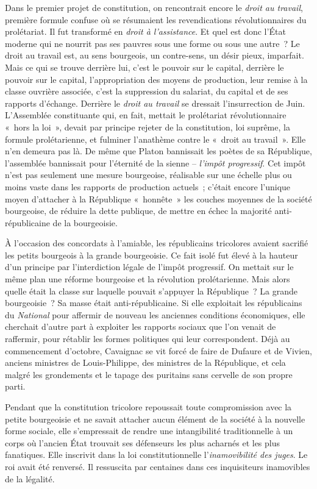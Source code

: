 \documentclass[twoside]{book} %
\begin{document}
Dans le premier projet de constitution, on rencontrait encore le \emph{droit au travail}, première formule confuse où se résumaient les revendications révolutionnaires du prolétariat. Il fut transformé en \emph{droit à l’assistance}. Et quel est donc l’État moderne qui ne nourrit pas ses pauvres sous une forme ou sous une autre ? Le droit au travail est, au sens bourgeois, un contre-sens, un désir pieux, imparfait. Mais ce qui se trouve derrière lui, c’est le pouvoir sur le capital, derrière le pouvoir sur le capital, l’appropriation des moyens de production, leur remise à la classe ouvrière associée, c’est la suppression du salariat, du capital et de ses rapports d’échange. Derrière le \emph{droit au travail} se dressait l’insurrection de Juin. L’Assemblée constituante qui, en fait, mettait le prolétariat révolutionnaire « hors la loi », devait par principe rejeter de la constitution, loi suprême, la formule prolétarienne, et fulminer l’anathème contre le « droit au travail ». Elle n’en demeura pas là. De même que Platon bannissait les poètes de sa République, l’assemblée bannissait pour l’éternité de la sienne – \emph{l’impôt progressif}. Cet impôt n’est pas seulement une mesure bourgeoise, réalisable sur une échelle plus ou moins vaste dans les rapports de production actuels ; c’était encore l’unique moyen d’attacher à la République « honnête » les couches moyennes de la société bourgeoise, de réduire la dette publique, de mettre en échec la majorité anti-républicaine de la bourgeoisie.\par
À l’occasion des concordats à l’amiable, les républicains tricolores avaient sacrifié les petits bourgeois à la grande bourgeoisie. Ce fait isolé fut élevé à la hauteur d’un principe par l’interdiction légale de l’impôt progressif. On mettait sur le même plan une réforme bourgeoise et la révolution prolétarienne. Mais alors quelle était la classe sur laquelle pouvait s’appuyer la République ? La grande bourgeoisie ? Sa masse était anti-républicaine. Si elle exploitait les républicains du \emph{National} pour affermir de nouveau les anciennes conditions économiques, elle cherchait d’autre part à exploiter les rapports sociaux que l’on venait de raffermir, pour rétablir les formes politiques qui leur correspondent. Déjà au commencement d’octobre, Cavaignac se vit forcé de faire de Dufaure et de Vivien, anciens ministres de Louis-Philippe, des ministres de la République, et cela malgré les grondements et le tapage des puritains sans cervelle de son propre parti.\par
Pendant que la constitution tricolore repoussait toute compromission avec la petite bourgeoisie et ne savait attacher aucun élément de la société à la nouvelle forme sociale, elle s’empressait de rendre une intangibilité traditionnelle à un corps où l’ancien État trouvait ses défenseurs les plus acharnés et les plus fanatiques. Elle inscrivit dans la loi constitutionnelle l’\emph{inamovibilité des juges}. Le roi avait été renversé. Il ressuscita par centaines dans ces inquisiteurs inamovibles de la légalité.\par
\end{document}
